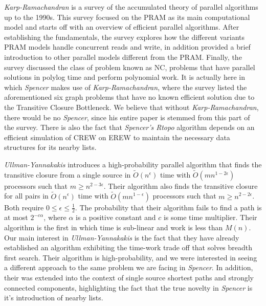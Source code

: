 \documentclass[paper=a4, fontsize=11pt]{scrartcl} %
\numberwithin{equation}{section} %
\numberwithin{figure}{section} %
\numberwithin{table}{section} %
\begin{document}
\textit{Karp-Ramachandran\cite{KR90}} is a survey of the accumulated theory of parallel algorithms up to the 1990s. This survey focused on the PRAM as its main computational model and starts off with an overview of efficient parallel algorithms. After establishing the fundamentals, the survey explores how the different variants PRAM models handle concurrent reads and write, in addition provided a brief introduction to other parallel models different from the PRAM. Finally, the survey discussed the class of problem known as NC, problems that have parallel solutions in polylog time and perform polynomial work.  It is actually here in which \textit{Spencer\cite{S97}} makes use of \textit{Karp-Ramachandran\cite{KR90}}, where the survey listed the aforementioned six graph problems that have no known efficient solution due to the Transitive Closure Bottleneck. We believe that without \textit{Karp-Ramachandran\cite{KR90}}, there would be no \textit{Spencer\cite{S97}}, since his entire paper is stemmed from this part of the survey. There is also the fact that \textit{Spencer\cite{S97}'s Rtopo} algorithm depends on an efficient simulation of CREW on EREW to maintain the necessary data structures for its nearby lists.

\textit{Ullman-Yannakakis\cite{UY91}} introduces a high-probability parallel algorithm that finds the transitive closure from a single source in $\tilde{O}(n^\epsilon)$ time with $\tilde{O}(mn^{1-2\epsilon})$ processors such that $m \geq n^{2-3\epsilon}$. Their algorithm also finds the transitive closure for all pairs in $\tilde{O}(n^\epsilon)$ time with $\tilde{O}(mn^{1-\epsilon})$ processors such that $m \geq n^{2-2\epsilon}$. Both require $0 \leq \epsilon \leq \frac{1}{2}$. The probability that their algorithm fails to find a path is at most $2^{-c\alpha}$, where $\alpha$ is a positive constant and $c$ is some time multiplier. Their algorithm is the first in which time is sub-linear and work is less than $M(n)$. Our main interest in \textit{Ullman-Yannakakis\cite{UY91}} is the fact that they have already established an algorithm exhibiting the time-work trade off that solves breadth first search. Their algorithm is high-probability, and we were interested in seeing a different approach to the same problem we are facing in \textit{Spencer\cite{S97}}. In addition, their was extended into the context of single source shortest paths and strongly connected components, highlighting the fact that the true novelty in \textit{Spencer\cite{S97}} is it's introduction of nearby lists.
\end{document}
